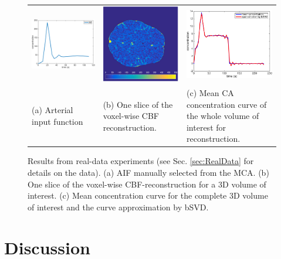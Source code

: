 \documentclass[journal,twocolumn]{IEEEtran}
\begin{document}
	\begin{figure}[h!tb]\label{fig:RealData}
		\begin{tabular}{p{} p{} p{} }
		 \includegraphics[width = .3\textwidth]{./figs/real_AIF.pdf} & \includegraphics[width = .3\textwidth]{./figs/real_axial160.pdf} & \includegraphics[width = .3\textwidth]{./figs/real_meanC.pdf} \\
		 (a) Arterial input function & (b) One slice of the voxel-wise CBF reconstruction.  & (c) Mean CA concentration curve of the whole volume of interest for reconstruction.
		\end{tabular}
		\caption{Results from real-data experiments (see Sec. \ref{sec:RealData} for details on the data). (a) AIF manually selected from the MCA. (b) One slice of the voxel-wise CBF-reconstruction for a 3D volume of interest. (c) Mean concentration curve for the complete 3D volume of interest and the curve approximation by bSVD.}
	\end{figure}
	

	
	
	\section{Discussion}\label{sec:conclusion}
	
\end{document}
